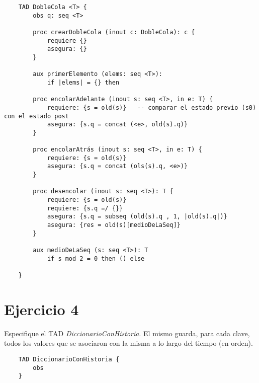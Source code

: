 \documentclass[10pt,a4paper]{article}
\begin{document}
\begin{lstlisting}
    TAD DobleCola <T> {
        obs q: seq <T>

        proc crearDobleCola (inout c: DobleCola): c {
            requiere {}
            asegura: {}
        }

        aux primerElemento (elems: seq <T>):
            if |elems| = {} then 

        proc encolarAdelante (inout s: seq <T>, in e: T) {
            requiere: {s = old(s)}   -- comparar el estado previo (s0) con el estado post
            asegura: {s.q = concat (<e>, old(s).q)}
        }

        proc encolarAtrás (inout s: seq <T>, in e: T) {
            requiere: {s = old(s)}  
            asegura: {s.q = concat (ols(s).q, <e>)}
        }

        proc desencolar (inout s: seq <T>): T {
            requiere: {s = old(s)}
            requiere: {s.q =/ {}}
            asegura: {s.q = subseq (old(s).q , 1, |old(s).q|)}
            asegura: {res = old(s)[medioDeLaSeq]}
        }

        aux medioDeLaSeq (s: seq <T>): T
            if s mod 2 = 0 then () else 

    }
\end{lstlisting}

\section{Ejercicio 4}
Especifique el TAD \textit{DiccionarioConHistoria}. El mismo guarda, para cada clave, todos los valores que se asociaron con la misma a lo largo del tiempo (en orden).

\begin{lstlisting}
    TAD DiccionarioConHistoria {
        obs
    }
\end{lstlisting}
\end{document}
